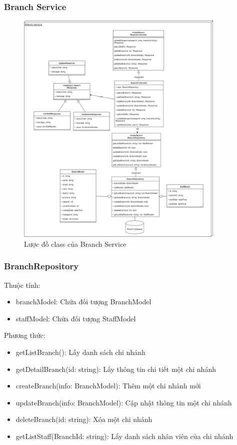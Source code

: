 \subsubsection{Branch Service}
\begin{figure}[!htp]
	\centering
	\includegraphics[width=10cm]{img/Architecture/service/BranchService.png}
	\newline
	\caption{Lược đồ class của Branch Service}
\end{figure}

\subsubsection*{BranchRepository}
Thuộc tính:
\begin{itemize}
	\item branchModel: Chứa đối tượng BranchModel
	\item staffModel: Chứa đối tượng StaffModel
\end{itemize}
Phương thức:
\begin{itemize}
	\item getListBranch(): Lấy danh sách chi nhánh
	\item getDetailBranch(id: string): Lấy thông tin chi tiết một chi nhánh
	\item createBranch(info: BranchModel): Thêm một chi nhánh mới
	\item updateBranch(info: BranchModel): Cập nhật thông tin một chi nhánh
	\item deleteBranch(id: string): Xóa một chi nhánh
	\item getListStaff(BranchId: string): Lấy danh sách nhân viên của chi nhánh
\end{itemize}

